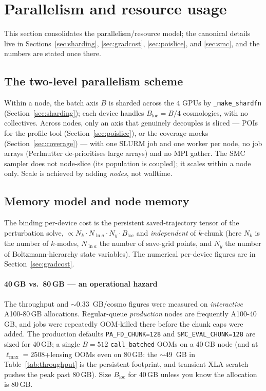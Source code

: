 \documentclass[11pt]{article}
\newcommand{\code}[1]{\texttt{\small #1}}
\newcommand{\Lmax}{\ell_{\max}}
\newcommand{\Bloc}{B_{\mathrm{loc}}}
\begin{document}
\section{Parallelism and resource usage}
\label{sec:resources}

This section consolidates the parallelism/resource model; the canonical
details live in Sections~\ref{sec:sharding}, \ref{sec:gradcost},
\ref{sec:poislice}, and \ref{sec:smc}, and the numbers are stated once
there.

\subsection{The two-level parallelism scheme}
Within a node, the batch axis $B$ is sharded across the $4$ GPUs by
\code{\_make\_shardfn} (Section~\ref{sec:sharding}); each device handles
$\Bloc=B/4$ cosmologies, with no collectives. Across nodes, only an
axis that genuinely decouples is sliced --- POIs for the profile tool
(Section~\ref{sec:poislice}), or the coverage mocks
(Section~\ref{sec:coverage}) --- with one SLURM job and one worker per node,
no job arrays (Perlmutter de-prioritises large arrays) and no MPI gather.
The SMC sampler does not node-slice (its population is coupled); it scales
within a node only. Scale is achieved by adding \emph{nodes}, not walltime.

\subsection{Memory model and node memory}
The binding per-device cost is the persistent saved-trajectory tensor of
the perturbation solve, $\propto N_k\cdot N_{\ln a}\cdot N_y\cdot\Bloc$
and \emph{independent} of $k$-chunk (here $N_k$ is the number of $k$-modes,
$N_{\ln a}$ the number of save-grid points, and $N_y$ the number of
Boltzmann-hierarchy state variables). The numerical per-device figures are
in Section~\ref{sec:gradcost}.

\paragraph{40\,GB vs.\ 80\,GB --- an operational hazard}
The throughput and $\sim0.33$~GB/cosmo figures were measured on
\emph{interactive} A100-80\,GB allocations. Regular-queue
\emph{production} nodes are frequently A100-40\,GB, and jobs were
repeatedly OOM-killed there before the chunk caps were added. The
production defaults \code{PA\_FD\_CHUNK=128} and \code{SMC\_EVAL\_CHUNK=128}
are sized for 40\,GB; a single $B=512$ \code{call\_batched} OOMs on a
40\,GB node (and at $\Lmax=2508$+lensing OOMs even on 80\,GB: the
$\sim49$~GB in Table~\ref{tab:throughput} is the persistent footprint, and
transient XLA scratch pushes the peak past 80\,GB). Size $\Bloc$ for 40\,GB
unless you know the allocation is 80\,GB.
\end{document}
